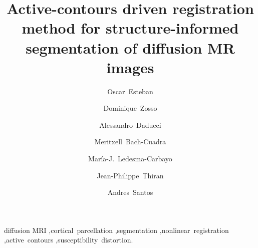 \documentclass[authoryear,onecolumn]{elsarticle}
\begin{document}
\begin{frontmatter}


\title{Active-contours driven registration method for structure-informed segmentation of diffusion MR images}

\author[bit,ciber]{Oscar~Esteban}
\author[ucla]{Dominique~Zosso}
\author[scil,lts5]{Alessandro~Daducci}
\author[chuv,lts5]{Meritxell~Bach-Cuadra}
\author[bit,ciber]{Mar\'ia-J.~Ledesma-Carbayo}
\author[lts5]{Jean-Philippe~Thiran}
\author[bit,ciber]{Andres~Santos}


\address[bit]{Biomedical Image Technologies (BIT), ETSI Telecomunicaci\'on, %
Universidad Polit\'ecnica de Madrid, Madrid, Spain}
\address[ciber]{Centro de Investigaci\'on Biom\'edica en Red en Bioingenier\'ia, Biomateriales y Nanomedicina (CIBER-BBN), Zaragoza, Spain}
\address[ucla]{Department of Mathematics, University of California,
Los Angeles (UCLA), Los Angeles, CA, US}
\address[scil]{Computer Science Department, Faculty of Science, Universit\'e de Sherbrooke, 2500 Boulevard Universit\'e, Sherbrooke, QC J1K 2R1, Canada}
\address[lts5]{Signal Processing Laboratory (LTS5), \'Ecole Polytechnique
F\'ed\'erale de Lausanne (EPFL), Lausanne, Switzerland}
\address[chuv]{Dept. of Radiology, University
Hospital Center (CHUV) and University of Lausanne (UNIL), Lausanne, Switzerland}

\begin{abstract}

\end{abstract}

\begin{keyword}
diffusion MRI \sep cortical~parcellation \sep segmentation %
\sep nonlinear~registration \sep active~contours \sep susceptibility~distortion.
\end{keyword}

\end{frontmatter}

\linenumbers











\appendix
{}


%


\end{document}
